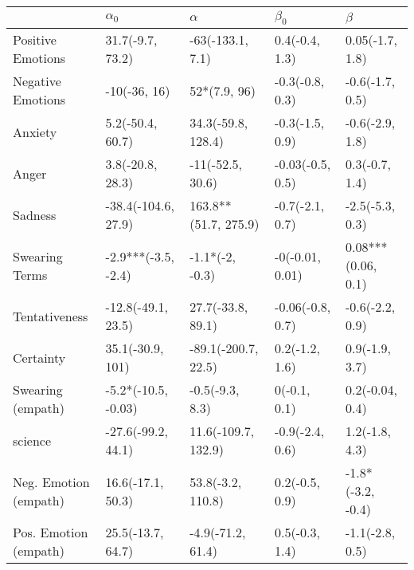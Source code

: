 \begin{tabular}{lllll}
\toprule
{} &           $\alpha_0$ &              $\alpha$ &         $\beta_0$ &             $\beta$ \\
\midrule
Positive Emotions     &     31.7(-9.7, 73.2) &      -63(-133.1, 7.1) &    0.4(-0.4, 1.3) &     0.05(-1.7, 1.8) \\
Negative Emotions     &         -10(-36, 16) &          52*(7.9, 96) &   -0.3(-0.8, 0.3) &     -0.6(-1.7, 0.5) \\
Anxiety               &     5.2(-50.4, 60.7) &    34.3(-59.8, 128.4) &   -0.3(-1.5, 0.9) &     -0.6(-2.9, 1.8) \\
Anger                 &     3.8(-20.8, 28.3) &      -11(-52.5, 30.6) &  -0.03(-0.5, 0.5) &      0.3(-0.7, 1.4) \\
Sadness               &  -38.4(-104.6, 27.9) &  163.8**(51.7, 275.9) &   -0.7(-2.1, 0.7) &     -2.5(-5.3, 0.3) \\
Swearing Terms        &  -2.9***(-3.5, -2.4) &       -1.1*(-2, -0.3) &   -0(-0.01, 0.01) &  0.08***(0.06, 0.1) \\
Tentativeness         &   -12.8(-49.1, 23.5) &     27.7(-33.8, 89.1) &  -0.06(-0.8, 0.7) &     -0.6(-2.2, 0.9) \\
Certainty             &     35.1(-30.9, 101) &   -89.1(-200.7, 22.5) &    0.2(-1.2, 1.6) &      0.9(-1.9, 3.7) \\
Swearing (empath)     &  -5.2*(-10.5, -0.03) &       -0.5(-9.3, 8.3) &      0(-0.1, 0.1) &     0.2(-0.04, 0.4) \\
science               &   -27.6(-99.2, 44.1) &   11.6(-109.7, 132.9) &   -0.9(-2.4, 0.6) &      1.2(-1.8, 4.3) \\
Neg. Emotion (empath) &    16.6(-17.1, 50.3) &     53.8(-3.2, 110.8) &    0.2(-0.5, 0.9) &   -1.8*(-3.2, -0.4) \\
Pos. Emotion (empath) &    25.5(-13.7, 64.7) &     -4.9(-71.2, 61.4) &    0.5(-0.3, 1.4) &     -1.1(-2.8, 0.5) \\
\bottomrule
\end{tabular}
